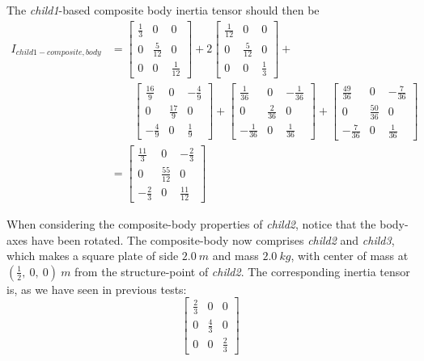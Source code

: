 \begin{description}
The \textit{child1}-based composite body inertia tensor should then be
\begin{equation*}
\begin{split}
I_{child1-composite,body} & = 
    \begin{bmatrix} \frac{1}{3} & 0   & 0  \\
                   0  & \frac{5}{12} & 0   \\
                    0  & 0   & \frac{1}{12} 
   \end{bmatrix}
   +2
   \begin{bmatrix} \frac{1}{12} & 0   & 0  \\
                   0   & \frac{5}{12} & 0   \\
                    0  & 0   & \frac{1}{3} 
   \end{bmatrix}
   +\\
    & \ \ \ \ \ \ \ \ \ 
\begin{bmatrix} \frac{16}{9} & 0   & -\frac{4}{9}  \\
                   0   & \frac{17}{9} & 0   \\
                    -\frac{4}{9}  & 0   & \frac{1}{9} 
   \end{bmatrix}
  +
\begin{bmatrix} \frac{1}{36} & 0   & -\frac{1}{36}  \\
                   0   & \frac{2}{36} & 0   \\
                    -\frac{1}{36}  & 0   & \frac{1}{36} 
   \end{bmatrix}
   +
\begin{bmatrix} \frac{49}{36} & 0   & -\frac{7}{36}  \\
                   0   & \frac{50}{36} & 0   \\
                    -\frac{7}{36}  & 0   & \frac{1}{36} 
   \end{bmatrix}
    \\
   & =
   \begin{bmatrix} \frac{11}{3} & 0   & -\frac{2}{3}  \\
                   0   & \frac{55}{12} & 0   \\
                    -\frac{2}{3}  & 0   & \frac{11}{12} 
   \end{bmatrix}
\end{split}
\end{equation*} 

When considering the composite-body properties of \textit{child2}, notice that 
the body-axes have been rotated.  The composite-body now comprises 
\textit{child2} and \textit{child3}, which makes a square plate of side 
$2.0~m$ and mass $2.0~kg$, with center of mass at $(\frac{1}{2},~0,~0)~m$ from 
the structure-point of \textit{child2}.  The corresponding inertia tensor is, 
as we have seen in previous tests:
\begin{equation*}
\begin{bmatrix} \frac{2}{3} & 0   & 0  \\
                   0  & \frac{4}{3} & 0   \\
                    0  & 0   & \frac{2}{3} 
   \end{bmatrix}
\end{equation*} 


\end{description}
